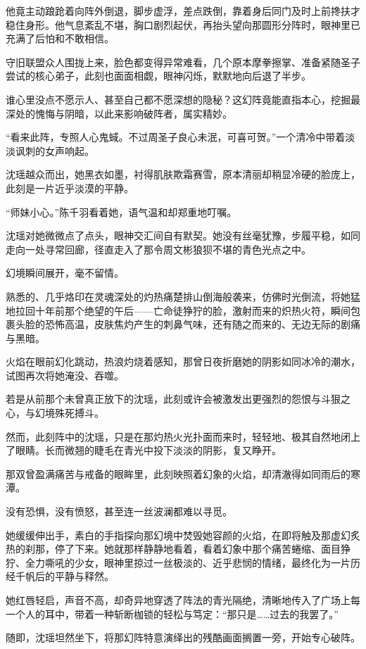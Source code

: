 他竟主动踉跄着向阵外倒退，脚步虚浮，差点跌倒，靠着身后同门及时上前搀扶才稳住身形。他气息紊乱不堪，胸口剧烈起伏，再抬头望向那圆形分阵时，眼神里已充满了后怕和不敢相信。

守旧联盟众人围拢上来，脸色都变得异常难看，几个原本摩拳擦掌、准备紧随圣子尝试的核心弟子，此刻也面面相觑，眼神闪烁，默默地向后退了半步。

谁心里没点不愿示人、甚至自己都不愿深想的隐秘？这幻阵竟能直指本心，挖掘最深处的愧悔与阴暗，以此来影响破阵者，属实精妙。

“看来此阵，专照人心鬼蜮。不过周圣子良心未泯，可喜可贺。”一个清冷中带着淡淡讽刺的女声响起。

沈瑶越众而出，她黑衣如墨，衬得肌肤欺霜赛雪，原本清丽却稍显冷硬的脸庞上，此刻是一片近乎淡漠的平静。

“师妹小心。”陈千羽看着她，语气温和却郑重地叮嘱。

沈瑶对她微微点了点头，眼神交汇间自有默契。她没有丝毫犹豫，步履平稳，如同走向一处寻常回廊，径直走入了那令周文彬狼狈不堪的青色光点之中。

幻境瞬间展开，毫不留情。

熟悉的、几乎烙印在灵魂深处的灼热痛楚排山倒海般袭来，仿佛时光倒流，将她猛地拉回十年前那个绝望的午后——亡命徒狰狞的脸，激射而来的炽热火符，瞬间包裹头脸的恐怖高温，皮肤焦灼产生的刺鼻气味，还有随之而来的、无边无际的剧痛与黑暗。

火焰在眼前幻化跳动，热浪灼烧着感知，那曾日夜折磨她的阴影如同冰冷的潮水，试图再次将她淹没、吞噬。

若是从前那个未曾真正放下的沈瑶，此刻或许会被激发出更强烈的怨恨与斗狠之心，与幻境殊死搏斗。

然而，此刻阵中的沈瑶，只是在那灼热火光扑面而来时，轻轻地、极其自然地闭上了眼睛。长而微翘的睫毛在青光中投下淡淡的阴影，复又睁开。

那双曾盈满痛苦与戒备的眼眸里，此刻映照着幻象的火焰，却清澈得如同雨后的寒潭。

没有恐惧，没有愤怒，甚至连一丝波澜都难以寻觅。

她缓缓伸出手，素白的手指探向那幻境中焚毁她容颜的火焰，在即将触及那虚幻炙热的刹那，停了下来。她就那样静静地看着，看着幻象中那个痛苦蜷缩、面目狰狞、全力嘶吼的少女，眼神里掠过一丝极淡的、近乎悲悯的情绪，最终化为一片历经千帆后的平静与释然。

她红唇轻启，声音不高，却奇异地穿透了阵法的青光隔绝，清晰地传入了广场上每一个人的耳中，带着一种斩断枷锁的轻松与笃定：“那只是……过去的我罢了。”

随即，沈瑶坦然坐下，将那幻阵特意演绎出的残酷画面搁置一旁，开始专心破阵。

